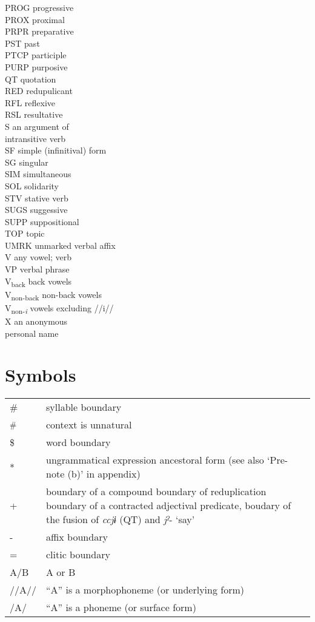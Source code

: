 \begin{multicols}{2}
\begin{tabbing}
PROG \>  progressive\\
PROX \>  proximal\\
PRPR \>  preparative\\
PST \>  past\\
PTCP \>  participle\\
PURP \>  purposive\\
QT \>  quotation\\
RED \>  redupulicant\\
RFL \>  reflexive\\
RSL \>  resultative\\
S \>  an argument of \\ \> intransitive verb\\
SF \>  simple (infinitival) form\\
SG \>  singular\\
SIM \>  simultaneous\\
SOL \>  solidarity\\
STV \>  stative verb\\
SUGS \>  suggessive\\
SUPP \>  suppositional\\
TOP \>  topic\\
UMRK \>  unmarked verbal affix\\
V \>  any vowel; verb\\
VP \>  verbal phrase\\
V\textsubscript{back} \>  back vowels\\
V\textsubscript{non-back} \>  non-back vowels\\
V\textsubscript{non-\textit{i}} \>  vowels excluding //i//\\
X \>  an anonymous \\ \> personal name
\end{tabbing}
\end{multicols}

\section*{Symbols}\enlargethispage{\baselineskip}
\begin{tabularx}{\textwidth}{@{}lQ@{}}
\#    & syllable boundary\\
\textsuperscript{\#}    & context is unnatural\\
\$    & word boundary\\
*    & ungrammatical expression ancestoral form (see also ‘Pre-note (b)’ in appendix)\\
+    & boundary of a compound boundary of reduplication boundary of a contracted adjectival predicate, boudary of the fusion of \textit{ccjɨ} (QT) and \textit{jˀ}{}- ‘say’\\
{}-    & affix boundary\\
=    & clitic boundary\\
A/B    & A or B\\
//A//    & “A” is a morphophoneme (or underlying form)\\
/A/    & “A” is a phoneme (or surface form)
\end{tabularx}
